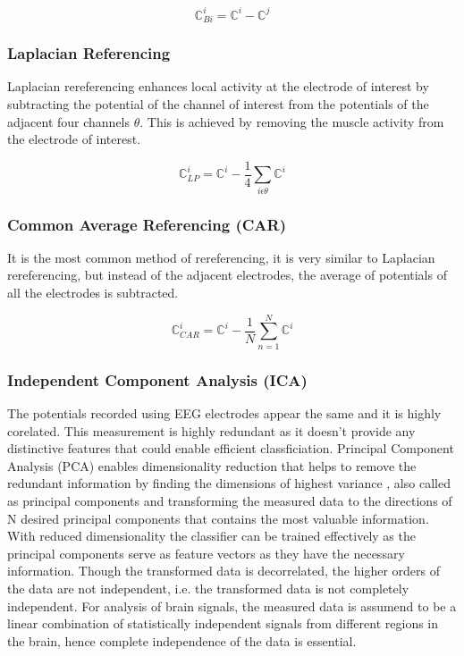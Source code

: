 \begin{equation} \label{eq:bip_eeg}
    \mathbb{C}^{i}_{Bi} =  \mathbb{C}^{i} - \mathbb{C}^{j}
\end{equation}

\subsubsection{Laplacian Referencing}
Laplacian rereferencing enhances local activity at the electrode of interest by subtracting the potential of the channel of interest from the potentials of the adjacent four channels $\theta$. This is achieved by removing the muscle activity from the electrode of interest.

\begin{equation} \label{eq:lap_eeg}
    \mathbb{C}^{i}_{LP} =  \mathbb{C}^{i} - \frac{1}{4} \sum_{i \epsilon \theta} \mathbb{C}^{i}
\end{equation}

\subsubsection{Common Average Referencing (CAR)}
It is the most common method of rereferencing, it is very similar to Laplacian rereferencing, but instead of the adjacent electrodes, the average of potentials of all the electrodes is subtracted.

\begin{equation} \label{eq:car_eeg}
    \mathbb{C}^{i}_{CAR} =  \mathbb{C}^{i} - \frac{1}{N} \sum_{n = 1}^{N} \mathbb{C}^{i}
\end{equation}

\subsubsection{Independent Component Analysis (ICA)}
The potentials recorded using EEG electrodes appear the same and it is highly corelated. This measurement is highly redundant as it doesn't provide any distinctive features that could enable efficient classficiation. Principal Component Analysis (PCA) enables dimensionality reduction that helps to remove the redundant information by finding the dimensions of highest variance , also called as principal components and transforming the measured data to the directions of N desired principal components that contains the most valuable information. With reduced dimensionality the classifier can be trained effectively as the principal components serve as feature vectors as they have the necessary information. Though the transformed data is decorrelated, the higher orders of the data are not independent, i.e. the transformed data is not completely independent. For analysis of brain signals, the measured data is assumend to be a linear combination of statistically independent signals from different regions in the brain, hence complete independence of the data is essential.

